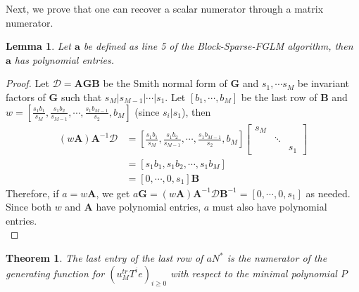 \documentclass[12pt]{article}
\newtheorem{theorem}[definition]{Theorem}
\newtheorem{lemma}[definition]{Lemma}
\def\mA{\mathbf{A}}
\def\mB{\mathbf{B}}
\def\mG{\mathbf{G}}
\begin{document}
Next, we prove that one can recover a scalar numerator
through a matrix numerator.

\begin{lemma}\label{utilde}
	Let $\textbf{a}$ be defined as line 5 of the Block-Sparse-FGLM algorithm, 
	then $\textbf{a}$ has polynomial entries.
\end{lemma}

\begin{proof}
	Let $\mathscr{D} = \mA\mG\mB$ be the Smith normal form of $\mG$ and $s_1, \cdots s_M$ be
	invariant factors of $\mG$ such that 
	$s_M | s_{M-1} | \cdots | s_1$.
	Let $[b_1,\cdots,b_M]$ be the last row of $\mB$ and 
	$w = [\frac{s_1b_1}{s_M},\frac{s_1b_2}{s_{M-1}},\cdots,\frac{s_1b_{M-1}}{s_2},b_M]$ (since $s_i | s_1$), then
	\begin{align*}
	(w \mA) \mA^{-1} \mathscr{D} &=  [\frac{s_1b_1}{s_M},\frac{s_1b_2}{s_{M-1}},\cdots,\frac{s_1b_{M-1}}{s_2},b_M]
	\begin{bmatrix}
	s_M &        & \\
	& \ddots & \\
	&        & s_1
	\end{bmatrix}\\
	&= [s_1b_1, s_1b_2, \cdots, s_1b_M]\\
	&= [0,\cdots,0,s_1] \mB
	\end{align*}
	Therefore, if $a = w \mA$, we get
	$ a \mG = (w \mA) \mA^{-1} \mathscr{D} \mB^{-1} = 
	[0,\cdots,0,s_1]$ as needed. Since both $w$ and $\mA$ have polynomial
	entries, $a$ must also have polynomial entries.\\
\end{proof}

\begin{theorem}
	 The last entry of the last row of $a N^*$ is  
	 the numerator of the generating function for 
	 $(u_{M}^{tr} T^i e)_{i \ge 0}$ with respect
	 to the minimal polynomial $P$
\end{theorem}
\end{document}
